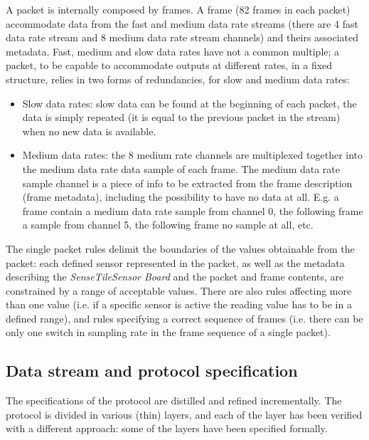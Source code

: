 \documentclass[english]{lni}
\newcommand{\ST}{\emph{SenseTile}\xspace}
\newcommand{\SB}{\emph{Sensor Board}\xspace}
\newcommand{\STSB}{\ST \SB\xspace}
\begin{document}
A packet is internally composed by frames. 
A frame (82 frames in each packet) accommodate data from the fast and medium data rate streams (there are 4 fast data rate stream and 8 medium data rate stream channels) and theirs associated metadata.
Fast, medium and slow data rates have not a common multiple; a packet, to be capable to accommodate outputs at different rates, in a fixed structure, relies in two forms of redundancies, for slow and medium data rates:
\begin{itemize}
\item Slow data rates: slow data can be found at the beginning of each packet, the data is simply repeated (it is equal to the previous packet in the stream) when no new data is available.
\item Medium data rates: the 8 medium rate channels are multiplexed together into the medium data rate data sample of each frame. The medium data rate sample channel is a piece of info to be extracted from the frame description (frame metadata), including the possibility to have no data at all. 
E.g. a frame contain a medium data rate sample from channel 0, the following frame a sample from channel 5, the following frame no sample at all, etc.
\end{itemize}

The single packet rules delimit the boundaries of the values obtainable from the packet: each defined sensor represented in the packet, as well as the metadata describing the \STSB and the packet and frame contents, are constrained by a range of acceptable values.
There are also rules affecting more than one value (i.e. if a specific sensor is active the reading value has to be in a defined range), and rules specifying a correct sequence of frames (i.e. there can be only one switch in sampling rate in the frame sequence of a single packet).



\subsection{Data stream and protocol specification}
\label{subsec:data_stream_and_protocol_specification}

The specifications of the protocol are distilled and refined incrementally.
The protocol is divided in various (thin) layers, and each of the layer has been verified with a different approach: some of the layers have been specified formally. 
\end{document}
